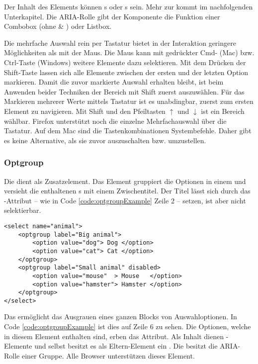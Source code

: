 Der Inhalt des Elements können s oder s sein. 
Mehr zur  kommt im nachfolgenden Unterkapitel. 
Die ARIA-Rolle gibt der Komponente die Funktion einer Combobox (ohne  \& ) oder Listbox. 

Die mehrfache Auswahl rein per Tastatur bietet in der Interaktion geringere Möglichkeiten als mit der Maus. 
Die Maus kann mit gedrückter Cmd- (Mac) bzw. Ctrl-Taste (Windows) weitere Elemente dazu selektieren. 
Mit dem Drücken der Shift-Taste lassen sich alle Elemente zwischen der ersten und der letzten Option markieren. 
Damit die zuvor markierte Auswahl erhalten bleibt, ist beim Anwenden beider Techniken der Bereich mit Shift zuerst auszuwählen. 
Für das Markieren mehrerer Werte mittels Tastatur ist es unabdingbar, zuerst zum ersten Element zu navigieren. 
Mit Shift und den Pfeiltasten $\uparrow$ und $\downarrow$ ist ein Bereich wählbar. 
Firefox unterstützt noch die einzelne Mehrfachauswahl über die Tastatur. 
Auf dem Mac sind die Tastenkombinationen Systembefehle. 
Daher gibt es keine Alternative, als sie zuvor auszuschalten bzw. umzustellen. 


\subsubsection{\color{dblue} Optgroup}
\label{sec:optgroup}

Die  dient als Zusatzelement. 
Das Element gruppiert die Optionen in einem  und versieht die enthaltenen s mit einem Zwischentitel. 
Der Titel lässt sich durch das -Attribut – wie in Code \ref{code:optgroupExample} Zeile 2 – setzen, ist aber nicht selektierbar. 

\begin{lstlisting}[style = htmlcssjs, caption = Beispiel – Optgroup, label = code:optgroupExample]
<select name="animal">
    <optgroup label="Big animal">
        <option value="dog"> Dog </option>
        <option value="cat"> Cat </option>
    </optgroup>
    <optgroup label="Small animal" disabled>
        <option value="mouse"  > Mouse   </option>
        <option value="hamster"> Hamster </option>
    </optgroup>
</select>
\end{lstlisting}

Das  ermöglicht das Ausgrauen eines ganzen Blocks von Auswahloptionen. 
In Code \ref{code:optgroupExample} ist dies auf Zeile 6 zu sehen. 
Die Optionen, welche in diesem Element enthalten sind, erben das Attribut. 
Als Inhalt dienen -Elemente und selbst besitzt es als Eltern-Element ein . 
Die  besitzt die ARIA-Rolle einer Gruppe. 
Alle Browser unterstützen dieses Element. 



